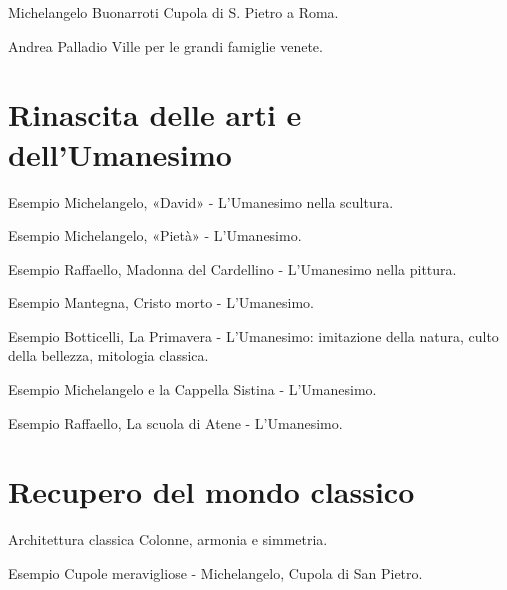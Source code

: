 \documentclass[12pt]{article}
\begin{document}
\begin{defn}{Michelangelo Buonarroti}
Cupola di S. Pietro a Roma.
\end{defn}


\begin{defn}{Andrea Palladio}
Ville per le grandi famiglie venete.
\end{defn}


\section{Rinascita delle arti e dell'Umanesimo}


\begin{ex}{Esempio}
Michelangelo, «David» - L'Umanesimo nella scultura.
\end{ex}


\begin{ex}{Esempio}
Michelangelo, «Pietà» - L'Umanesimo.
\end{ex}


\begin{ex}{Esempio}
Raffaello, Madonna del Cardellino - L'Umanesimo nella pittura.
\end{ex}


\begin{ex}{Esempio}
Mantegna, Cristo morto - L'Umanesimo.
\end{ex}


\begin{ex}{Esempio}
Botticelli, La Primavera - L'Umanesimo: imitazione della natura, culto della bellezza, mitologia classica.
\end{ex}


\begin{ex}{Esempio}
Michelangelo e la Cappella Sistina - L'Umanesimo.
\end{ex}


\begin{ex}{Esempio}
Raffaello, La scuola di Atene - L'Umanesimo.
\end{ex}


\section{Recupero del mondo classico}


\begin{defn}{Architettura classica}
Colonne, armonia e simmetria.
\end{defn}


\begin{ex}{Esempio}
Cupole meravigliose - Michelangelo, Cupola di San Pietro.
\end{ex}
\end{document}
